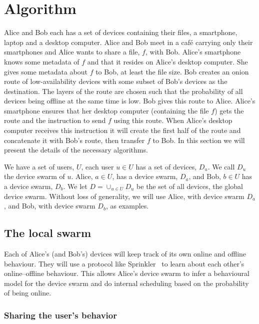 \section{Algorithm}%
\label{Algorithm}

Alice and Bob each has a set of devices containing their files, \eg a 
smartphone, laptop and a desktop computer.
Alice and Bob meet in a café carrying only their smartphones and Alice wants to 
share a file, \(f\), with Bob.
Alice's smartphone knows some metadata of \(f\) and that it resides on Alice's 
desktop computer.
She gives some metadata about \(f\) to Bob, at least the file size.
Bob creates an onion route of low-availability devices with some subset of Bob's 
devices as the destination.
The layers of the route are chosen such that the probability of all devices 
being offline at the same time is low.
Bob gives this route to Alice.
Alice's smartphone ensures that her desktop computer (containing the file \(f\)) 
gets the route and the instruction to send \(f\) using this route.
When Alice's desktop computer receives this instruction it will create the first 
half of the route and concatenate it with Bob's route, then transfer \(f\) to 
Bob.
In this section we will present the details of the necessary algorithms.

We have a set of users, \(U\), each user \(u\in U\) has a set of devices, 
\(D_u\).
We call \(D_u\) the device swarm of \(u\).
Alice, \(a\in U\), has a device swarm, \(D_a\), and Bob, \(b\in U\) has a device 
swarm, \(D_b\).
We let \(D = \cup_{u\in U} D_u\) be the set of all devices, the global device 
swarm.
Without loss of generality, we will use Alice, with device swarm \(D_a\), and 
Bob, with device swarm \(D_b\), as examples.

\subsection{The local swarm}%
\label{local-overlay}

Each of Alice's (and Bob's) devices will keep track of its own online and 
offline behaviour.
They will use a protocol like Sprinkler~\cite{luxey:hal-01704172} to learn about 
each other's online--offline behaviour.
This allows Alice's device swarm to infer a behavioural model for the device 
swarm and do internal scheduling based on the probability of being online.

\subsubsection{Sharing the user's behavior}%
\label{ssub:sharing_the_user_s_behavior}

